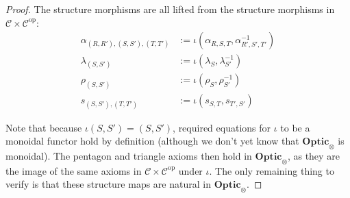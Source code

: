 \documentclass[11pt,a4paper]{article}
\theoremstyle{plain}
\theoremstyle{definition}
\newcommand{\C}{\mathscr{C}}
\newcommand{\Optic}{\mathbf{Optic}}
\newcommand{\op}{\mathrm{op}}
\begin{document}
\begin{proof}
  The structure morphisms are all lifted from the structure morphisms in $\C \times \C^\op$:
  \begin{align*}
    \alpha_{(R, R'), (S, S'), (T, T')} &:= \iota(\alpha_{R,S,T}, \alpha_{R',S',T'}^{-1}) \\
    \lambda_{(S, S')} &:= \iota(\lambda_{S}, \lambda_{S'}^{-1}) \\
    \rho_{(S, S')} &:= \iota(\rho_{S}, \rho_{S'}^{-1}) \\
    s_{(S, S'), (T, T')} &:= \iota(s_{S, T}, s_{T', S'})
  \end{align*}

  Note that because $\iota(S, S') = (S, S')$, required equations for $\iota$ to be a monoidal functor hold by definition (although we don't yet know that $\Optic_\otimes$ is monoidal). The pentagon and triangle axioms then hold in $\Optic_\otimes$, as they are the image of the same axioms in $\C \times \C^\op$ under $\iota$. The only remaining thing to verify is that these structure maps are natural in $\Optic_\otimes$.


\end{proof}
\end{document}
